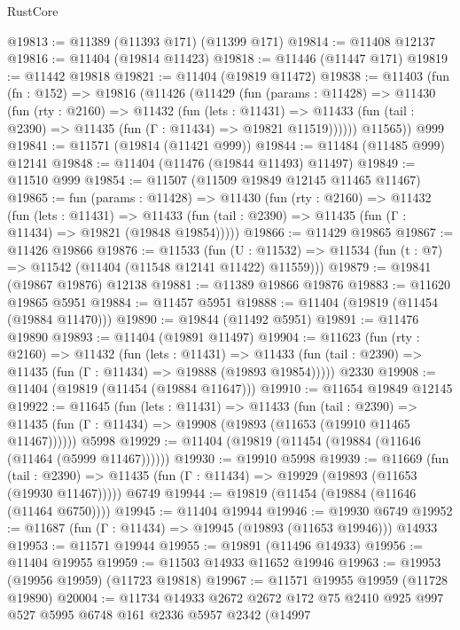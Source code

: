 \begin{lexlean}{RustCore}
\begin{coremodule}
@19813 := @11389 (@11393 @171) (@11399 @171)
@19814 := @11408 @12137
@19816 := @11404 (@19814 @11423)
@19818 := @11446 (@11447 @171)
@19819 := @11442 @19818
@19821 := @11404 (@19819 @11472)
@19838 := @11403
    (fun (fn : @152) =>
    @19816
      (@11426
        (@11429
          (fun (params : @11428) =>
          @11430
            (fun (rty : @2160) =>
            @11432
              (fun (lets : @11431) =>
              @11433 (fun (tail : @2390) => @11435 (fun (Γ : @11434) => @19821 @11519))))))
        @11565))
    @999
@19841 := @11571 (@19814 (@11421 @999))
@19844 := @11484 (@11485 @999) @12141
@19848 := @11404 (@11476 (@19844 @11493) @11497)
@19849 := @11510 @999
@19854 := @11507 (@11509 @19849 @12145 @11465 @11467)
@19865 := fun (params : @11428) =>
  @11430
    (fun (rty : @2160) =>
    @11432
      (fun (lets : @11431) =>
      @11433 (fun (tail : @2390) => @11435 (fun (Γ : @11434) => @19821 (@19848 @19854)))))
@19866 := @11429 @19865
@19867 := @11426 @19866
@19876 := @11533
    (fun (U : @11532) => @11534 (fun (t : @7) => @11542 (@11404 (@11548 @12141 @11422) @11559)))
@19879 := @19841 (@19867 @19876) @12138
@19881 := @11389 @19866 @19876
@19883 := @11620 @19865 @5951
@19884 := @11457 @5951
@19888 := @11404 (@19819 (@11454 (@19884 @11470)))
@19890 := @19844 (@11492 @5951)
@19891 := @11476 @19890
@19893 := @11404 (@19891 @11497)
@19904 := @11623
    (fun (rty : @2160) =>
    @11432
      (fun (lets : @11431) =>
      @11433 (fun (tail : @2390) => @11435 (fun (Γ : @11434) => @19888 (@19893 @19854)))))
    @2330
@19908 := @11404 (@19819 (@11454 (@19884 @11647)))
@19910 := @11654 @19849 @12145
@19922 := @11645
    (fun (lets : @11431) =>
    @11433
      (fun (tail : @2390) =>
      @11435 (fun (Γ : @11434) => @19908 (@19893 (@11653 (@19910 @11465 @11467))))))
    @5998
@19929 := @11404 (@19819 (@11454 (@19884 (@11646 (@11464 (@5999 @11467))))))
@19930 := @19910 @5998
@19939 := @11669
    (fun (tail : @2390) => @11435 (fun (Γ : @11434) => @19929 (@19893 (@11653 (@19930 @11467)))))
    @6749
@19944 := @19819 (@11454 (@19884 (@11646 (@11464 @6750))))
@19945 := @11404 @19944
@19946 := @19930 @6749
@19952 := @11687 (fun (Γ : @11434) => @19945 (@19893 (@11653 @19946))) @14933
@19953 := @11571 @19944
@19955 := @19891 (@11496 @14933)
@19956 := @11404 @19955
@19959 := @11503 @14933 @11652 @19946
@19963 := @19953 (@19956 @19959) (@11723 @19818)
@19967 := @11571 @19955 @19959 (@11728 @19890)
@20004 := @11734
    @14933
    @2672
    @2672
    @172
    @75
    @2410
    @925
    @997
    @527
    @5995
    @6748
    @161
    @2336
    @5957
    @2342
    (@14997

\end{coremodule}
\end{lexlean}
